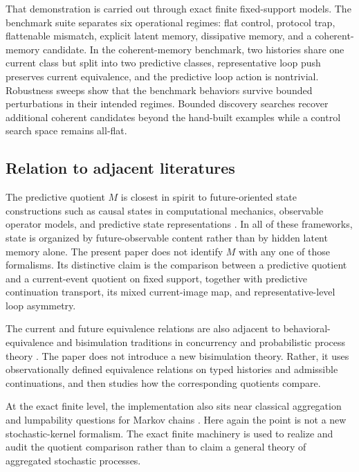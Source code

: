 \documentclass[11pt]{article}
\newcommand{\PredictiveQ}{M}
\theoremstyle{definition}
\begin{document}
That demonstration is carried out through exact finite fixed-support models. The benchmark suite separates six operational regimes: flat control, protocol trap, flattenable mismatch, explicit latent memory, dissipative memory, and a coherent-memory candidate. In the coherent-memory benchmark, two histories share one current class but split into two predictive classes, representative loop push preserves current equivalence, and the predictive loop action is nontrivial. Robustness sweeps show that the benchmark behaviors survive bounded perturbations in their intended regimes. Bounded discovery searches recover additional coherent candidates beyond the hand-built examples while a control search space remains all-flat.

\subsection{Relation to adjacent literatures}\label{subsec:intro-related}
The predictive quotient $\PredictiveQ$ is closest in spirit to future-oriented state constructions such as causal states in computational mechanics, observable operator models, and predictive state representations \citep{ShaliziCrutchfield2001ComputationalMechanics,Jaeger2000ObservableOperatorModels,LittmanSuttonSingh2002PredictiveRepresentationsState}. In all of these frameworks, state is organized by future-observable content rather than by hidden latent memory alone. The present paper does not identify $\PredictiveQ$ with any one of those formalisms. Its distinctive claim is the comparison between a predictive quotient and a current-event quotient on fixed support, together with predictive continuation transport, its mixed current-image map, and representative-level loop asymmetry.

The current and future equivalence relations are also adjacent to behavioral-equivalence and bisimulation traditions in concurrency and probabilistic process theory \citep{Park1981ConcurrencyAutomata,Milner1989CommunicationConcurrency,LarsenSkou1991BisimulationThroughProbabilisticTesting}. The paper does not introduce a new bisimulation theory. Rather, it uses observationally defined equivalence relations on typed histories and admissible continuations, and then studies how the corresponding quotients compare.

At the exact finite level, the implementation also sits near classical aggregation and lumpability questions for Markov chains \citep{KemenySnell1976FiniteMarkovChains,Norris1998MarkovChains,Buchholz1994ExactOrdinaryLumpability}. Here again the point is not a new stochastic-kernel formalism. The exact finite machinery is used to realize and audit the quotient comparison rather than to claim a general theory of aggregated stochastic processes.
\end{document}

